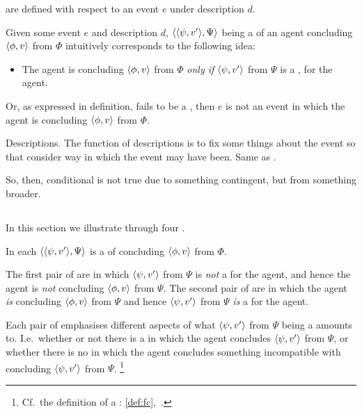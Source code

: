 \begin{note}
   are defined with respect to an event \(e\) under description \(d\).

  Given some event \(e\) and description \(d\), \(\langle \langle \psi, v' \rangle, \Psi \rangle\) being a \requ{} of an agent concluding \(\langle \phi, v \rangle\) from \(\Phi\) intuitively corresponds to the following idea:
  \begin{itemize}
  \item
    The agent is concluding \(\langle \phi, v \rangle\) from \(\Phi\) \emph{only if} \(\langle \psi, v' \rangle\) from \(\Psi\) is a \fc{}, for the agent.
  \end{itemize}

  Or, as expressed in definition, fails to be a \fc{}, then \(e\) is not an event in which the agent is concluding \(\langle \phi, v \rangle\) from \(\Phi\).

  Descriptions.
  The function of descriptions is to fix some things about the event so that consider way in which the event may have been.
  Same as \qWhyV{}.

  So, then, conditional is not true due to something contingent, but from something broader.
\end{note}


\subsection{}
\label{cha:requs:requs:illu}

\begin{note}
  In this section we illustrate  through four .

  In each  \(\langle \langle \psi, v' \rangle, \Psi \rangle\) is a \requ{} of concluding \(\langle \phi, v \rangle\) from \(\Phi\).

  The first pair of  are  in which \(\langle \psi, v' \rangle\) from \(\Psi\) is \emph{not} a \fc{} for the agent, and hence the agent is \emph{not} concluding \(\langle \phi, v \rangle\) from \(\Psi\).
  The second pair of  are  in which the agent \emph{is} concluding \(\langle \phi, v \rangle\) from \(\Psi\) and hence \(\langle \psi, v' \rangle\) from \(\Psi\) \emph{is} a \fc{} for the agent.

  Each pair of  emphasises different aspects of what \(\langle \psi, v' \rangle\) from \(\Psi\) being a \fc{} amounts to.
  I.e.\ whether or not there is a \pevent{} in which the agent concludes \(\langle \psi, v' \rangle\) from \(\Psi\), or whether there is no \pevent{} in which the agent concludes something incompatible with concluding \(\langle \psi, v' \rangle\) from \(\Psi\).%
  \footnote{
    Cf.\ the definition of a \fc{}: \autoref{def:fc},~.
  }
\end{note}

